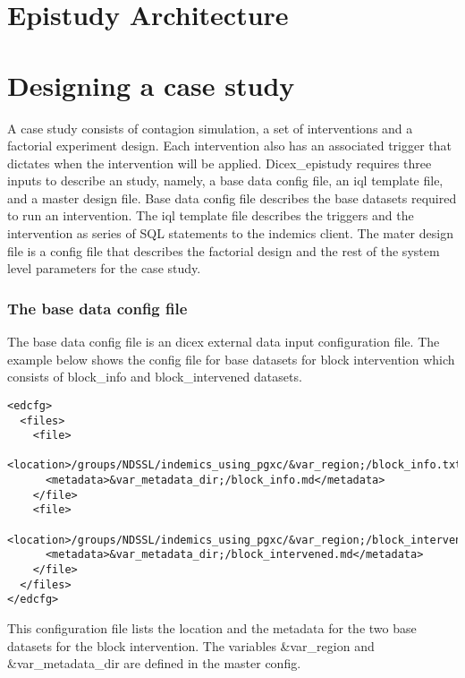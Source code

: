 \documentclass[11]{report}
\begin{document}
\chapter{Epistudy Architecture}

\chapter{Designing a case study}
A case study consists of contagion simulation, a set of interventions and  a factorial experiment design. Each intervention
also has an associated trigger that dictates when the intervention will be applied.
Dicex\_epistudy requires three inputs to describe an study, namely, a base data config file, an iql template file,  and a master
design file.
Base data config file describes the base datasets required to run an intervention. The iql template file describes the triggers
and the intervention as series of SQL statements to the indemics client.
The mater design file is a config file that describes the factorial design and the  rest of the system level parameters for the case study.

\subsection{The base data config file}
The base data config file is an dicex external data input configuration file. The example below
shows the config file for base datasets for block intervention which consists of block\_info and
block\_intervened datasets.
\begin{lstlisting}[style=XML]
  <edcfg>
  <files>
    <file>
      <location>/groups/NDSSL/indemics_using_pgxc/&var_region;/block_info.txt</location>
      <metadata>&var_metadata_dir;/block_info.md</metadata>
    </file>
    <file>
      <location>/groups/NDSSL/indemics_using_pgxc/&var_region;/block_intervened.txt</location>
      <metadata>&var_metadata_dir;/block_intervened.md</metadata>
    </file>
  </files>
</edcfg>
\end{lstlisting}
This configuration file lists the location and the metadata for the two base datasets  for the block
intervention.
The variables \&var\_region and \&var\_metadata\_dir are defined in the master config.
\end{document}
